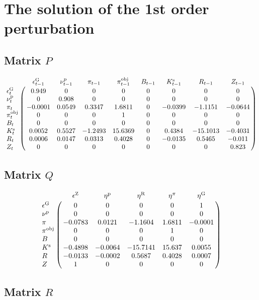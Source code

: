 \section{The solution of the 1st order perturbation}

\subsection*{Matrix $P$}

$$\bordermatrix{
~ & \epsilon^{\mathrm{G}}_{t-1} & \nu^{\mathrm{p}}_{t-1} & \pi_{t-1} & \pi^{\mathrm{obj}}_{t-1} & B_{t-1} & K^{\mathrm{s}}_{t-1} & R_{t-1} & Z_{t-1} \cr
\epsilon^{\mathrm{G}}_{t} & 0.949 & 0 & 0 & 0 & 0 & 0 & 0 & 0 \cr
\nu^{\mathrm{p}}_{t} & 0 & 0.908 & 0 & 0 & 0 & 0 & 0 & 0 \cr
\pi_{t} & -0.0001 & 0.0549 & 0.3347 & 1.6811 & 0 & -0.0399 & -1.1151 & -0.0644 \cr
\pi^{\mathrm{obj}}_{t} & 0 & 0 & 0 & 1 & 0 & 0 & 0 & 0 \cr
B_{t} & 0 & 0 & 0 & 0 & 0 & 0 & 0 & 0 \cr
K^{\mathrm{s}}_{t} & 0.0052 & 0.5527 & -1.2493 & 15.6369 & 0 & 0.4384 & -15.1013 & -0.4031 \cr
R_{t} & 0.0006 & 0.0147 & 0.0313 & 0.4028 & 0 & -0.0135 & 0.5465 & -0.011 \cr
Z_{t} & 0 & 0 & 0 & 0 & 0 & 0 & 0 & 0.823 \cr
}$$

\subsection*{Matrix $Q$}

$$\bordermatrix{
~ & \epsilon^{\mathrm{Z}} & \eta^{\mathrm{p}} & \eta^{\mathrm{R}} & \eta^{\pi} & \eta^{\mathrm{G}} \cr
\epsilon^{\mathrm{G}} & 0 & 0 & 0 & 0 & 1 \cr
\nu^{\mathrm{p}} & 0 & 0 & 0 & 0 & 0 \cr
\pi & -0.0783 & 0.0121 & -1.1604 & 1.6811 & -0.0001 \cr
\pi^{\mathrm{obj}} & 0 & 0 & 0 & 1 & 0 \cr
B & 0 & 0 & 0 & 0 & 0 \cr
K^{\mathrm{s}} & -0.4898 & -0.0064 & -15.7141 & 15.637 & 0.0055 \cr
R & -0.0133 & -0.0002 & 0.5687 & 0.4028 & 0.0007 \cr
Z & 1 & 0 & 0 & 0 & 0 \cr
}$$

\subsection*{Matrix $R$}

